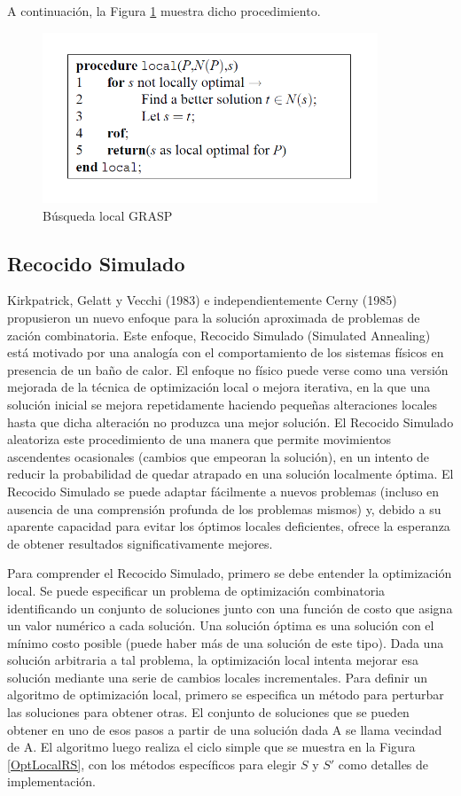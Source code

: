 \documentclass[a4paper,openright,11pt,oneside]{book}
\begin{document}
		A continuación, la Figura \ref{GRASPlocal} muestra dicho procedimiento.
		
		\begin{figure}[h]
			\centering
			\includegraphics[width=10cm]{./Graphics/GRASPlocal.png}
			\caption{Búsqueda local GRASP}
			\label{GRASPlocal}
		\end{figure}
	
	\subsection{Recocido Simulado}
		Kirkpatrick, Gelatt y Vecchi (1983) e independientemente Cerny (1985) propusieron un nuevo enfoque para la solución aproximada de problemas de 
		zación combinatoria. Este enfoque, Recocido Simulado \cite{RecocidoSimulado} (Simulated Annealing) está motivado por una analogía con el comportamiento de los sistemas físicos en presencia de un baño de calor. El enfoque no físico puede verse como una versión mejorada de la técnica de optimización local o mejora iterativa, en la que una solución inicial se mejora repetidamente haciendo pequeñas alteraciones locales hasta que dicha alteración no produzca una mejor solución. El Recocido Simulado aleatoriza este procedimiento de una manera que permite movimientos ascendentes ocasionales (cambios que empeoran la solución), en un intento de reducir la probabilidad de quedar atrapado en una solución localmente óptima. El Recocido Simulado se puede adaptar fácilmente a nuevos problemas (incluso en ausencia de una comprensión profunda de los problemas mismos) y, debido a su aparente capacidad para evitar los óptimos locales deficientes, ofrece la esperanza de obtener resultados significativamente mejores.
		
		Para comprender el Recocido Simulado, primero se debe entender la optimización local. Se puede especificar un problema de optimización combinatoria identificando un conjunto de soluciones junto con una función de costo que asigna un valor numérico a cada solución. Una solución óptima es una solución con el mínimo costo posible (puede haber más de una solución de este tipo). Dada una solución arbitraria a tal problema, la optimización local intenta mejorar esa solución mediante una serie de cambios locales incrementales. Para definir un algoritmo de optimización local, primero se especifica un método para perturbar las soluciones para obtener otras. El conjunto de soluciones que se pueden obtener en uno de esos pasos a partir de una solución dada A se llama vecindad de A. El algoritmo luego realiza el ciclo simple que se muestra en la Figura \ref{OptLocalRS}, con los métodos específicos para elegir $S$ y $S'$ como detalles de implementación.
		
\end{document}
